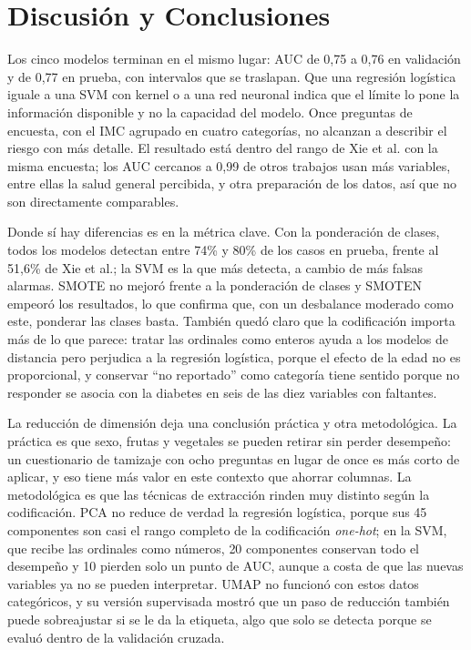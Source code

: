 \section{Discusión y Conclusiones}\label{sec:conclusiones}
Los cinco modelos terminan en el mismo lugar: AUC de 0,75 a 0,76 en validación y de 0,77 en prueba, con intervalos que se traslapan. Que una regresión logística iguale a una SVM con kernel o a una red neuronal indica que el límite lo pone la información disponible y no la capacidad del modelo. Once preguntas de encuesta, con el IMC agrupado en cuatro categorías, no alcanzan a describir el riesgo con más detalle. El resultado está dentro del rango de Xie et al. \cite{xie2019} con la misma encuesta; los AUC cercanos a 0,99 de otros trabajos \cite{majcherek2025} usan más variables, entre ellas la salud general percibida, y otra preparación de los datos, así que no son directamente comparables.

Donde sí hay diferencias es en la métrica clave. Con la ponderación de clases, todos los modelos detectan entre 74\% y 80\% de los casos en prueba, frente al 51,6\% de Xie et al.; la SVM es la que más detecta, a cambio de más falsas alarmas. SMOTE no mejoró frente a la ponderación de clases y SMOTEN empeoró los resultados, lo que confirma que, con un desbalance moderado como este, ponderar las clases basta. También quedó claro que la codificación importa más de lo que parece: tratar las ordinales como enteros ayuda a los modelos de distancia pero perjudica a la regresión logística, porque el efecto de la edad no es proporcional, y conservar ``no reportado'' como categoría tiene sentido porque no responder se asocia con la diabetes en seis de las diez variables con faltantes.

La reducción de dimensión deja una conclusión práctica y otra metodológica. La práctica es que sexo, frutas y vegetales se pueden retirar sin perder desempeño: un cuestionario de tamizaje con ocho preguntas en lugar de once es más corto de aplicar, y eso tiene más valor en este contexto que ahorrar columnas. La metodológica es que las técnicas de extracción rinden muy distinto según la codificación. PCA no reduce de verdad la regresión logística, porque sus 45 componentes son casi el rango completo de la codificación \textit{one-hot}; en la SVM, que recibe las ordinales como números, 20 componentes conservan todo el desempeño y 10 pierden solo un punto de AUC, aunque a costa de que las nuevas variables ya no se pueden interpretar. UMAP no funcionó con estos datos categóricos, y su versión supervisada mostró que un paso de reducción también puede sobreajustar si se le da la etiqueta, algo que solo se detecta porque se evaluó dentro de la validación cruzada.

